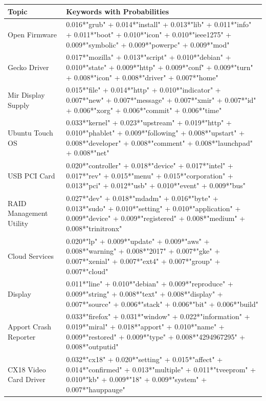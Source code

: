 \documentclass[a4paper,12pt,twoside]{report}
\begin{document}
\begin{table} %
    \centering
    \begin{adjustbox}{max width=\columnwidth}
    \def\arraystretch{1} %
    \begin{tabular}{p{3cm} p{12cm}}
        \toprule
        \textbf{Topic} & \textbf{Keywords with Probabilities}\\
        \midrule
			Open Firmware & 0.016*"grub" + 0.014*"install" + 0.013*"lib" + 0.011*"info" + 0.011*"boot" + 0.010*"icon" + 0.010*"ieee1275" + 0.009*"symbolic" + 0.009*"powerpc" + 0.009*"mod" \\
			\midrule 
			Gecko Driver & 0.017*"mozilla" + 0.013*"script" + 0.010*"debian" + 0.010*"state" + 0.009*"http" + 0.009*"conf" + 0.009*"turn" + 0.008*"icon" + 0.008*"driver" + 0.007*"home" \\ 
			\midrule 
			Mir Display Supply & 0.015*"file" + 0.014*"http" + 0.010*"indicator" + 0.007*"new" + 0.007*"message" + 0.007*"xmir" + 0.007*"id" + 0.006*"xorg" + 0.006*"commit" + 0.006*"time" \\
			\midrule 
			Ubuntu Touch OS & 0.033*"kernel" + 0.023*"upstream" + 0.019*"http" + 0.010*"phablet" + 0.009*"following" + 0.008*"upstart" + 0.008*"developer" + 0.008*"comment" + 0.008*"launchpad" + 0.008*"net" \\
			\midrule 
			USB PCI Card & 0.020*"controller" + 0.018*"device" + 0.017*"intel" + 0.017*"rev" + 0.015*"menu" + 0.015*"corporation" + 0.013*"pci" + 0.012*"usb" + 0.010*"event" + 0.009*"bus" \\
			\midrule 
			RAID Management Utility & 0.027*"dev" + 0.018*"mdadm" + 0.016*"byte" + 0.013*"sudo" + 0.010*"setting" + 0.010*"application" + 0.009*"device" + 0.009*"registered" + 0.008*"medium" + 0.008*"trinitronx" \\
			\midrule 
			Cloud Services & 0.020*"lp" + 0.009*"update" + 0.009*"aws" + 0.008*"warning" + 0.008*"2017" + 0.007*"gke" + 0.007*"xenial" + 0.007*"ext4" + 0.007*"group" + 0.007*"cloud" \\
			\midrule 
			Display & 0.011*"line" + 0.010*"debian" + 0.009*"reproduce" + 0.009*"string" + 0.008*"text" + 0.008*"display" + 0.007*"source" + 0.006*"stack" + 0.006*"bit" + 0.006*"build" \\
			\midrule 
			Apport Crash Reporter & 0.033*"firefox" + 0.031*"window" + 0.022*"information" + 0.019*"miral" + 0.018*"apport" + 0.010*"name" + 0.009*"restored" + 0.009*"type" + 0.008*"4294967295" + 0.008*"outputid" \\
			\midrule 
			CX18 Video Card Driver & 0.032*"cx18" + 0.020*"setting" + 0.015*"affect" + 0.014*"confirmed" + 0.013*"multiple" + 0.011*"tveeprom" + 0.010*"kb" + 0.009*"18" + 0.009*"system" + 0.007*"hauppauge" \\
        \midrule
    \end{tabular}
    \end{adjustbox}
    \label{tab:tmUbuntu}
\end{table} 
\end{document}
